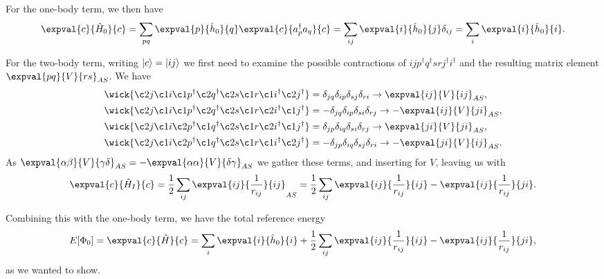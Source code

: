 For the one-body term, we then have
\begin{equation}
    \expval{c}{\hat{H}_0}{c} = \sum_{pq} \expval{p}{\hat{h}_0}{q} \expval{c}{a_p^\dagger a_q}{c} = \sum_{ij} \expval{i}{\hat{h}_0}{j} \delta_{ij} = \sum_{i} \expval{i}{\hat{h}_0}{i}.
\end{equation}

For the two-body term, writing $\lvert c\rangle = \lvert i j\rangle$ we first need to examine the possible contractions of $ i j p^\dagger q^\dagger s r j^\dagger i^\dagger$ and the resulting matrix element $\expval{pq}{V}{rs}_{AS}$.
We have
\begin{align*}
    \wick{
        \c2 j
        \c1 i
        \c1 p^\dagger
        \c2 q^\dagger
        \c2 s
        \c1 r
        \c1 i^\dagger
        \c2 j^\dagger
    } &= \delta_{jq} \delta_{ip} \delta_{sj} \delta_{ri} \to \expval{ij}{V}{ij}_{AS}, \\
    \wick{
        \c2 j
        \c1 i
        \c1 p^\dagger
        \c2 q^\dagger
        \c2 s
        \c1 r
        \c2 i^\dagger
        \c1 j^\dagger
    } &= -\delta_{jq} \delta_{ip} \delta_{si} \delta_{rj} \to -\expval{ij}{V}{ji}_{AS}, \\
    \wick{
        \c2 j
        \c1 i
        \c2 p^\dagger
        \c1 q^\dagger
        \c2 s
        \c1 r
        \c2 i^\dagger
        \c1 j^\dagger
    } &= \delta_{jp} \delta_{iq} \delta_{si} \delta_{rj} \to \expval{ji}{V}{ji}_{AS}, \\
    \wick{
        \c2 j
        \c1 i
        \c2 p^\dagger
        \c1 q^\dagger
        \c2 s
        \c1 r
        \c1 i^\dagger
        \c2 j^\dagger
    } &= -\delta_{jp} \delta_{iq} \delta_{sj} \delta_{ri} \to -\expval{ji}{V}{ij}_{AS}.
\end{align*}
As $\expval{\alpha \beta}{V}{\gamma \delta}_{AS} = - \expval{\alpha \alpha}{V}{\delta \gamma}_{AS}$ we gather these terms, and inserting for $V$, leaving us with
\begin{equation}
    \expval{c}{\hat{H}_I}{c} = \frac{1}{2} \sum_{ij} \expval{ij}{\frac{1}{r_{ij}}}{ij}_{AS} = \frac{1}{2} \sum_{ij} \expval{ij}{\frac{1}{r_{ij}}}{ij} - \expval{ij}{\frac{1}{r_{ij}}}{ji}.
\end{equation}

Combining this with the one-body term, we have the total reference energy
\begin{equation}
    E[\Phi_0] = \expval{c}{\hat{H}}{c} = \sum_{i} \expval{i}{\hat{h}_0}{i} + \frac{1}{2} \sum_{ij} \expval{ij}{\frac{1}{r_{ij}}}{ij} - \expval{ij}{\frac{1}{r_{ij}}}{ji},
\end{equation}
as we wanted to show.

